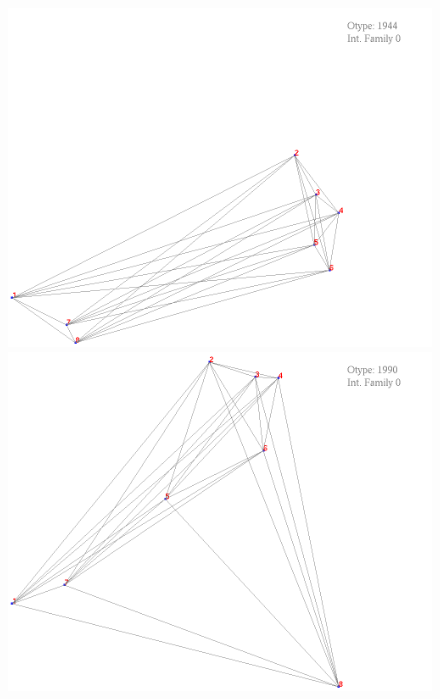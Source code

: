\documentclass[11pt,epsf,times,letterpaper]{article}
\begin{document}
	\begin{figure}
		\includegraphics[scale=.4]{if_tam0_tam1/19.png}
		\includegraphics[scale=.4]{if_tam0_tam1/20.png}
	\end{figure}
	
\end{document}
